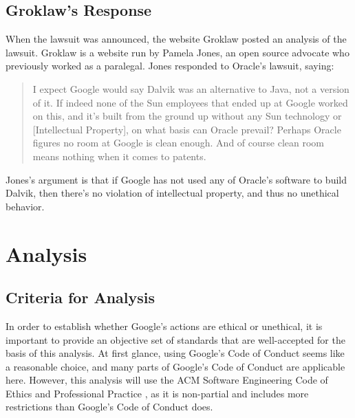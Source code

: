 \documentclass[11pt]{article}
\begin{document}
\begin{multicols}{2}

\subsection{Groklaw's Response} %
\label{sub:args_groklaw}

When the lawsuit was announced, the website Groklaw posted an analysis of the
lawsuit.  Groklaw is a website run by Pamela Jones, an open source advocate who
previously worked as a paralegal. \cite{groklaw-pj} Jones responded to Oracle's
lawsuit, saying: \cite{groklaw}

\begin{quotation}
I expect Google would say Dalvik was an alternative to Java, not a version of
it. If indeed none of the Sun employees that ended up at Google worked on this,
and it's built from the ground up without any Sun technology or [Intellectual
Property], on what basis can Oracle prevail? Perhaps Oracle figures no room at
Google is clean enough. And of course clean room means nothing when it comes to
patents.
\end{quotation}

Jones's argument is that if Google has not used any of Oracle's software to
build Dalvik, then there's no violation of intellectual property, and thus no
unethical behavior.



\section{Analysis} %
\label{sec:analysis}

\subsection{Criteria for Analysis} %
\label{sub:criteria}

In order to establish whether Google's actions are ethical or unethical, it is
important to provide an objective set of standards that are well-accepted for
the basis of this analysis.  At first glance, using Google's Code of Conduct
\cite{google-conduct} seems like a reasonable choice, and many parts of Google's
Code of Conduct are applicable here.  However, this analysis will use the ACM
Software Engineering Code of Ethics and Professional Practice \cite{secode}, as
it is non-partial and includes more restrictions than Google's Code of Conduct
does.


\end{multicols}
\end{document}
